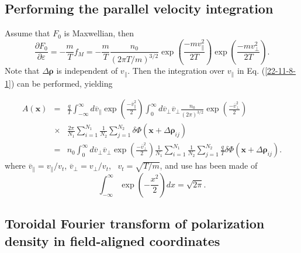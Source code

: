 \documentclass{llncs}
\begin{document}
\subsection{Performing the parallel velocity integration}

Assume that $F_0$ is Maxwellian, then
\begin{equation}
  \frac{\partial F_0}{\partial \varepsilon} = - \frac{m}{T} f_M = -
  \frac{m}{T} \frac{n_0}{(2 \pi T / m)^{3 / 2}} \exp \left( \frac{- m
  v^2_{\parallel}}{2 T} \right) \exp \left( \frac{- m v^2_{\perp}}{2 T}
  \right) .
\end{equation}
Note that $\Delta \mathbf{\rho}$ is independent of $v_{\parallel}$. Then the
integration over $v_{\parallel}$ in Eq. (\ref{22-11-8-1}) can be performed,
yielding


\begin{eqnarray}
  A (\mathbf{x}) & = & \frac{q}{T}  \int_{- \infty}^{\infty} d
  \overline{v}_{\parallel} \exp \left( \frac{- \overline{v}^2_{\parallel}}{2}
  \right) \int_0^{\infty} d \overline{v}_{\perp} \overline{v}_{\perp}
  \frac{n_0}{(2 \pi)^{3 / 2}} \exp \left( \frac{- \overline{v}^2_{\perp}}{2}
  \right) \nonumber\\
  & \times & \frac{2 \pi}{N_1} \sum_{i = 1}^{N_1} \frac{1}{N_2}  \sum_{j =
  1}^{N_2} \delta \Phi (\mathbf{x} + \Delta \mathbf{\rho}_{i j}) \nonumber\\
  & = & n_0  \int_0^{\infty} d \overline{v}_{\perp} \overline{v}_{\perp} \exp
  \left( \frac{- \overline{v}^2_{\perp}}{2} \right) \frac{1}{N_1} \sum_{i =
  1}^{N_1} \frac{1}{N_2}  \sum_{j = 1}^{N_2} \frac{q}{T} \delta \Phi
  (\mathbf{x} + \Delta \mathbf{\rho}_{i j}) .  \label{21-9-16-a5}
\end{eqnarray}
where $\overline{v}_{\parallel} = v_{\parallel} / v_t$, $\overline{v}_{\perp}
= v_{\perp} / v_t$, \ $v_t = \sqrt{T / m}$, and use has been made of
\begin{equation}
  \int_{- \infty}^{\infty} \exp \left( - \frac{x^2}{2} \right) d x = \sqrt{2
  \pi} .
\end{equation}

\subsection{Toroidal Fourier transform of polarization density in
field-aligned coordinates}
\end{document}
